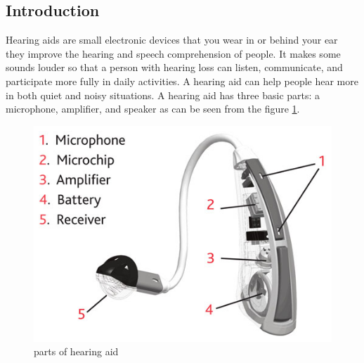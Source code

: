 \documentclass[sigconf]{acmart}
\begin{document}
\subsection{Introduction}


Hearing aids are small electronic devices that you wear in or behind your ear they improve the hearing and speech comprehension of people. It makes some sounds louder so that a person with hearing loss can listen, communicate, and participate more fully in daily activities. A hearing aid can help people hear more in both quiet and noisy situations. A hearing aid has three basic parts: a microphone, amplifier, and speaker as can be seen from the figure \ref{f:hearingaidparts}.

\begin{figure}[!ht]
  \centering\includegraphics[width=\columnwidth]{images/hearingaidbreakdown.jpg}
  \caption{parts of hearing aid}\label{f:hearingaidparts}
\end{figure}  
\end{document}
